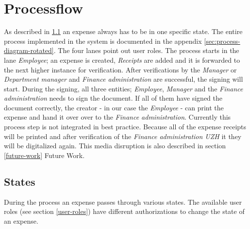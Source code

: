 \section{Processflow}
\label{sec:processflow}
As described in \ref{sec:states} an expense always has to be in one specific state. The entire process implemented in the system is documented in the appendix \ref{sec:process-diagram-rotated}. The four lanes point out user roles.\newline 
The process starts in the lane \textit{Employee}; an expense is created, \textit{Receipts} are added and it is forwarded to the next higher instance for verification. After verifications by the \textit{Manager} or \textit{Department manager} and \textit{Finance administration} are successful, the signing will start. During the signing, all three entities; \textit{Employee}, \textit{Manager} and the \textit{Finance administration} needs to sign the document. If all of them have signed the document correctly, the creator - in our case the \textit{Employee} - can print the expense and hand it over over to the \textit{Finance administration}. Currently this process step is not integrated in best practice. Because all of the expense receipts will be printed and after verification of the \textit{Finance administration UZH} it they will be digitalized again. This media disruption is also described in section \ref{future-work} Future Work.

\subsection{States}
\label{sec:states}
During the process an expense passes through various states. The available user roles (see section \ref{user-roles}) have different authorizations to change the state of an expense.  

